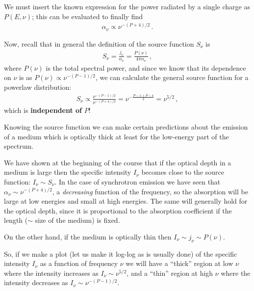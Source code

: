 \documentclass[main.tex]{subfiles}
\begin{document}
We must insert the known expression for the power radiated by a single charge as \(P(E, \nu )\); this can be evaluated to finally find 
%
\begin{align}
\alpha _\nu \propto \nu^{- (P+4) / 2}
\,.
\end{align}

Now, recall that in general the definition of the source function \(S_\nu \) is 
%
\begin{align}
S_\nu = \frac{j_\nu }{\alpha _\nu } = \frac{P(\nu )}{4 \pi \alpha _\nu }
\,,
\end{align}
%
where \(P(\nu )\) is the total spectral power, and since we know that its dependence on \(\nu \) is as \(P(\nu ) \propto \nu^{- (P-1) / 2}\), we can calculate the general source function for a powerlaw distribution: 
%
\begin{align}
S_\nu \propto \frac{\nu^{- (P-1 ) / 2}}{\nu^{- (P+4) / 2}} = \nu^{- \frac{P - 1 + P - 4}{2}} = \nu^{5/2}
\,,
\end{align}
%
which is \textbf{independent of} \(P\)! 

Knowing the source function we can make certain predictions about the emission of a medium which is optically thick at least for the low-energy part of the spectrum. 

We have shown at the beginning of the course that if the optical depth in a medium is large then the specific intensity \(I_\nu \) becomes close to the source function: \(I_\nu  \sim S_\nu \). 
In the case of synchrotron emission we have seen that \(\alpha_\nu \sim \nu^{- (P+4) / 2}\), a \emph{decreasing} function of the frequency, so the absorption will be large at low energies and small at high energies. 
The same will generally hold for the optical depth, since it is proportional to the absorption coefficient if the length (\(\sim\) size of the medium) is fixed. 

On the other hand, if the medium is optically thin then \(I_\nu \sim j_\nu \sim P(\nu )\). 

So, if we make a plot (let us make it log-log as is usually done) of the specific intensity \(I_\nu \) as a function of frequency \(\nu \) we will have a ``thick'' region at low \(\nu \) where the intensity increases as \(I_\nu \sim \nu^{5/2}\), and a ``thin'' region at high \(\nu \) where the intensity decreases as \(I_\nu \sim \nu^{- (P-1) / 2}\). 
\end{document}
